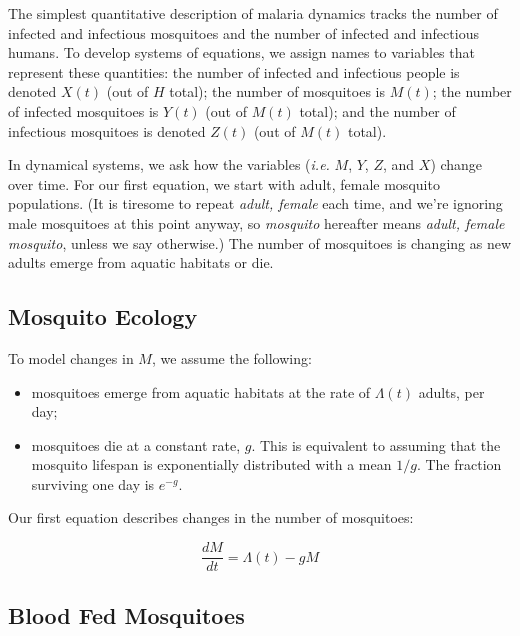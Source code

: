 \documentclass[
]{book}
\begin{document}
The simplest quantitative description of malaria dynamics tracks the number of infected and infectious mosquitoes and the number of infected and infectious humans. To develop systems of equations, we assign names to variables that represent these quantities: the number of infected and infectious people is denoted \(X(t)\) (out of \(H\) total); the number of mosquitoes is \(M(t)\); the number of infected mosquitoes is \(Y(t)\) (out of \(M(t)\) total); and the number of infectious mosquitoes is denoted \(Z(t)\) (out of \(M(t)\) total).

In dynamical systems, we ask how the variables (\emph{i.e.} \(M\), \(Y\), \(Z\), and \(X\)) change over time. For our first equation, we start with adult, female mosquito populations. (It is tiresome to repeat \emph{adult, female} each time, and we're ignoring male mosquitoes at this point anyway, so \emph{mosquito} hereafter means \emph{adult, female mosquito}, unless we say otherwise.) The number of mosquitoes is changing as new adults emerge from aquatic habitats or die.

\hypertarget{mosquito-ecology}{%
\subsection{Mosquito Ecology}\label{mosquito-ecology}}

To model changes in \(M\), we assume the following:

\begin{itemize}
\item
  mosquitoes emerge from aquatic habitats at the rate of \(\Lambda(t)\) adults, per day;
\item
  mosquitoes die at a constant rate, \(g\). This is equivalent to assuming that the mosquito lifespan is exponentially distributed with a mean \(1/g\). The fraction surviving one day is \(e^{-g}\).
\end{itemize}

Our first equation describes changes in the number of mosquitoes:

\begin{equation}
\frac{dM}{dt} = \Lambda(t) - g M
\end{equation}

\hypertarget{blood-fed-mosquitoes}{%
\subsection{Blood Fed Mosquitoes}\label{blood-fed-mosquitoes}}
\end{document}

